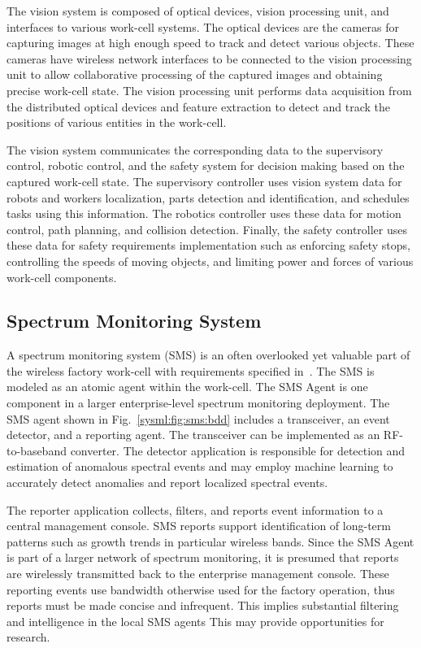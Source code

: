 The vision system is composed of optical devices, vision processing unit, and interfaces to various work-cell systems. The optical devices are the cameras for capturing images at high enough speed to track and detect various objects. These cameras have wireless network interfaces to be connected to the vision processing unit to allow collaborative processing of the captured images and obtaining precise work-cell state. The vision processing unit performs data acquisition from the distributed optical devices and feature extraction to detect and track the positions of various entities in the work-cell. 

The vision system communicates the corresponding data to the supervisory control, robotic control, and the safety system for decision making based on the captured work-cell state. The supervisory controller uses vision system data for robots and workers localization, parts detection and identification, and schedules tasks using this information. The robotics controller uses these data for motion control, path planning, and collision detection. Finally, the safety controller uses these data for safety requirements implementation such as enforcing safety stops, controlling the speeds of moving objects, and limiting power and forces of various work-cell components.    

\subsection{Spectrum Monitoring System}\label{sysml:sec:sms}
A spectrum monitoring system (SMS) is an often overlooked yet valuable part of the wireless factory work-cell with requirements specified in~\cite{Candell2017.SMS}.  The SMS is modeled as an atomic agent within the work-cell.  The SMS Agent is one component in a larger enterprise-level spectrum monitoring deployment.  The SMS agent shown in Fig.~\ref{sysml:fig:sms:bdd} includes a transceiver, an event detector, and a reporting agent.  The transceiver can be implemented as an RF-to-baseband converter.  The detector application is responsible for detection and estimation of anomalous spectral events and may employ machine learning to accurately detect anomalies and report localized spectral events.

The reporter application collects, filters, and reports event information to a central management console.  SMS reports support identification of long-term patterns such as growth trends in particular wireless bands.  Since the SMS Agent is part of a larger network of spectrum monitoring, it is presumed that reports are wirelessly transmitted back to the enterprise management console.  These reporting events use bandwidth otherwise used for the factory operation, thus reports must be made concise and infrequent.  This implies substantial filtering and intelligence in the local SMS agents This may provide opportunities for research.

